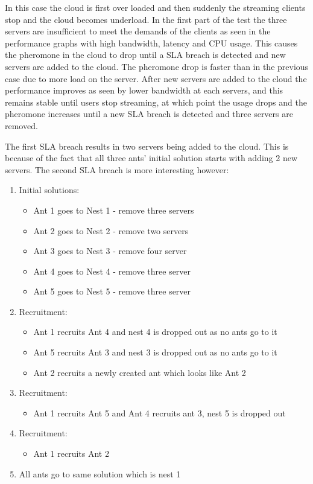 In this case the cloud is first over loaded and then suddenly the streaming clients stop and the cloud becomes underload. In the first part of the test the three servers are insufficient to meet the demands of the clients as seen in the performance graphs with high bandwidth, latency and CPU usage. This causes the pheromone in the cloud to drop until a SLA breach is detected and new servers are added to the cloud. The pheromone drop is faster than in the previous case due to more load on the server. After new servers are added to the cloud the performance improves as seen by lower bandwidth at each servers, and this remains stable until users stop streaming, at which point the usage drops and the pheromone increases until a new SLA breach is detected and three servers are removed.

The first SLA breach results in two servers being added to the cloud. This is because of the fact that all three ants' initial solution starts with adding 2 new servers. The second SLA breach is more interesting however:

\begin{enumerate}
	\item Initial solutions: 
	\begin{itemize}
		\item Ant 1 goes to Nest 1 - remove three servers
		\item Ant 2 goes to Nest 2 - remove two servers
		\item Ant 3 goes to Nest 3 - remove four server
		\item Ant 4 goes to Nest 4 - remove three server
		\item Ant 5 goes to Nest 5 - remove three server
	\end{itemize}
	\item Recruitment:
	\begin{itemize}
		\item Ant 1 recruits Ant 4 and nest 4 is dropped out as no ants go to it
		\item Ant 5 recruits Ant 3 and nest 3 is dropped out as no ants go to it
		\item Ant 2 recruits a newly created ant which looks like Ant 2
	\end{itemize}
	\item Recruitment:
	\begin{itemize}
		\item Ant 1 recruits Ant 5 and Ant 4 recruits ant 3, nest 5 is dropped out
	\end{itemize}
	\item Recruitment:
	\begin{itemize}
		\item Ant 1 recruits Ant 2
	\end{itemize}
	\item All ants go to same solution which is nest 1
\end{enumerate}

